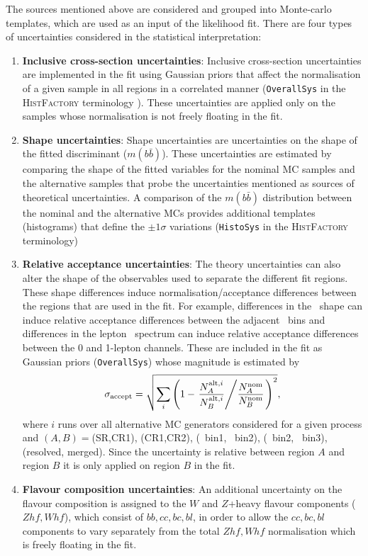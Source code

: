 \par The sources mentioned above are considered and grouped into Monte-carlo templates, which are used as an input of the likelihood fit. There are four types of uncertainties considered in the statistical interpretation:

\begin{enumerate}
    \item \textbf{Inclusive cross-section uncertainties}: Inclusive cross-section uncertainties are implemented in the fit using Gaussian priors that affect the normalisation of a given sample in all regions in a correlated manner (\texttt{OverallSys} in the \textsc{HistFactory} terminology \cite{Cranmer:1456844}). These uncertainties are applied only on the samples whose normalisation is not freely floating in the fit.
    \item \textbf{Shape uncertainties}: Shape uncertainties are uncertainties on the shape of the fitted discriminant ($m(b\bar{b})$). These uncertainties are estimated by comparing the shape of the fitted variables for the nominal MC samples and the alternative samples that probe the uncertainties mentioned as sources of theoretical uncertainties. A comparison of the $m(b\bar{b})$ distribution between the nominal and the alternative MCs provides additional templates (histograms) that define the $\pm1\sigma$ variations (\texttt{HistoSys} in the \textsc{HistFactory} terminology)
    \item \textbf{Relative acceptance uncertainties}: The theory uncertainties can also alter the shape of the observables used to separate the different fit regions. These shape differences induce normalisation/acceptance differences between the regions that are used in the fit. For example, differences in the \met~shape can induce relative acceptance differences between the adjacent \met~bins and differences in the lepton \pt~spectrum can induce relative acceptance differences between the 0 and 1-lepton channels. These are included in the fit as Gaussian priors (\texttt{OverallSys}) whose magnitude is estimated by
    \begin{equation}
    \sigma_{\text{accept}}=\sqrt{\sum_i \left( 1 - \left. \frac{N_A^{\text{alt},i}}{N_B^{\text{alt},i}} \middle/ \frac{N_A^{\text{nom}}}{N_B^{\text{nom}}} \right. \right)^2},
    \end{equation}
    where $i$ runs over all alternative MC generators considered for a given process and $(A,B)=$(SR,CR1), (CR1,CR2), (\met~bin1, \met~bin2), (\met~bin2, \met~bin3), (resolved, merged). Since the uncertainty is relative between region $A$ and region $B$ it is only applied on region $B$ in the fit.
    \item \textbf{Flavour composition uncertainties}: An additional uncertainty on the flavour composition is assigned to the $W$ and $Z$+heavy flavour components ($Zhf, Whf$), which consist of $bb,cc,bc,bl$, in order to allow the $cc,bc,bl$ components to vary separately from the total $Zhf, Whf$ normalisation which is freely floating in the fit.
\end{enumerate}

